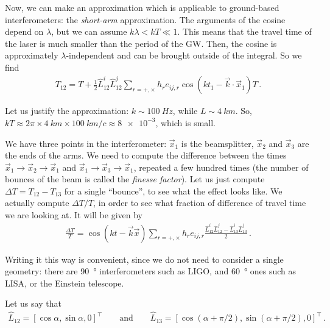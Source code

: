 \documentclass[main.tex]{subfiles}
\begin{document}
Now, we can make an approximation which is applicable to ground-based interferometers: the \emph{short-arm} approximation. The arguments of the cosine depend on \(\lambda \), but we can assume \(k \lambda  < kT \ll 1\). This means that the travel time of the laser is much smaller than the period of the GW. Then, the cosine is approximately \(\lambda \)-independent and can be brought outside of the integral. So we find 
%
\begin{align}
T_{12} = T + \frac{1}{2} \hat{L}_{12}^{i} \hat{L}_{12}^{j} \sum _{r = +, \times } h_{r} e_{ij, r} \cos(k t_1 - \vec{k} \cdot \vec{x}_{1}) T
\,.
\end{align}

Let us justify the approximation: \(k \sim \SI{100}{Hz}\), while \(L \sim \SI{4}{km}\). So, \(kT \approx 2 \pi \times \SI{4}{km} \times \SI{100}{km} / c \approx \num{8e-3}\), which is small. 

We have three points in the interferometer: \(\vec{x}_{1}\) is the beamsplitter, \(\vec{x}_{2}\) and \(\vec{x}_{3}\) are the ends of the arms. We need to compute the difference between the times \(\vec{x}_{1} \rightarrow \vec{x}_{2} \rightarrow \vec{x}_{1}\) and \(\vec{x}_{1} \rightarrow \vec{x}_{3} \rightarrow \vec{x}_{1}\), repeated a few hundred times (the number of bounces of the beam is called the \emph{finesse factor}). Let us just compute \(\Delta T = T_{12} - T_{13} \) for a single ``bounce'', to see what the effect looks like. We actually compute \(\Delta T / T\), in order to see what fraction of difference of travel time we are looking at. It will be given by 
%
\begin{align}
\frac{\Delta T}{T} = \cos(kt - \vec{k} \vec{x}) \sum _{r = + , \times } h_{r} e_{ij, r} \frac{\hat{L}_{12}^{i}\hat{L}_{12}^{j} - \hat{L}_{13}^{i}\hat{L}_{13}^{j}}{2}
\,.
\end{align}

Writing it this way is convenient, since we do not need to consider a single geometry: there are \SI{90}{\degree} interferometers such as LIGO, and \SI{60}{\degree} ones such as LISA, or the Einstein telescope. 

Let us say that 
%
\begin{align}
\hat{L}_{12} = [\cos \alpha , \sin \alpha , 0]^{\top} \qquad \text{and} \qquad \hat{L}_{13} = [\cos(\alpha + \pi /2), \sin(\alpha + \pi /2) , 0]^{\top}
\,.
\end{align}
\end{document}
